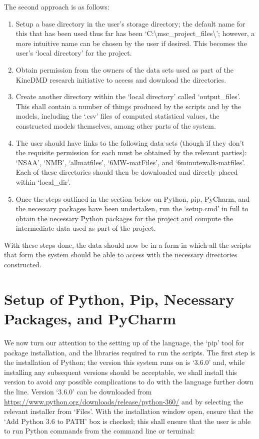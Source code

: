 \documentclass[12pt,twoside]{report}
\begin{document}
The second approach is as follows:

\begin{enumerate}
	\item Setup a base directory in the user’s storage directory; the default name for this that has been used thus far has been ‘C:\textbackslash msc\_project\_files\textbackslash’; however, a more intuitive name can be chosen by the user if desired. This becomes the user’s ‘local directory’ for the project.
	\item Obtain permission from the owners of the data sets used as part of the KineDMD research initiative to access and download the directories.
	\item Create another directory within the ‘local directory’ called ‘output\_files’. This shall contain a number of things produced by the scripts and by the models, including the ‘.csv’ files of computed statistical values, the constructed models themselves, among other parts of the system.
	\item The user should have links to the following data sets (though if they don’t the requisite permission for each must be obtained by the relevant parties): ‘NSAA’, ‘NMB’, ‘allmatfiles’, ‘6MW-matFiles’, and ‘6minutewalk-matfiles’. Each of these directories should then be downloaded and directly placed within ‘local\_dir’.
	\item Once the steps outlined in the section below on Python, pip, PyCharm, and the necessary packages have been undertaken, run the ‘setup.cmd’ in full to obtain the necessary Python packages for the project and compute the intermediate data used as part of the project.
\end{enumerate}

\quad With these steps done, the data should now be in a form in which all the scripts that form the system should be able to access with the necessary directories constructed.


\section{Setup of Python, Pip, Necessary Packages, and PyCharm}

\quad We now turn our attention to the setting up of the language, the ‘pip’ tool for package installation, and the libraries required to run the scripts. The first step is the installation of Python; the version this system runs on is ‘3.6.0’ and, while installing any subsequent versions should be acceptable, we shall install this version to avoid any possible complications to do with the language further down the line. Version ‘3.6.0’ can be downloaded from \url{https://www.python.org/downloads/release/python-360/} and by selecting the relevant installer from ‘Files’. With the installation window open, ensure that the ‘Add Python 3.6 to PATH’ box is checked; this shall ensure that the user is able to run Python commands from the command line or terminal:
\end{document}
